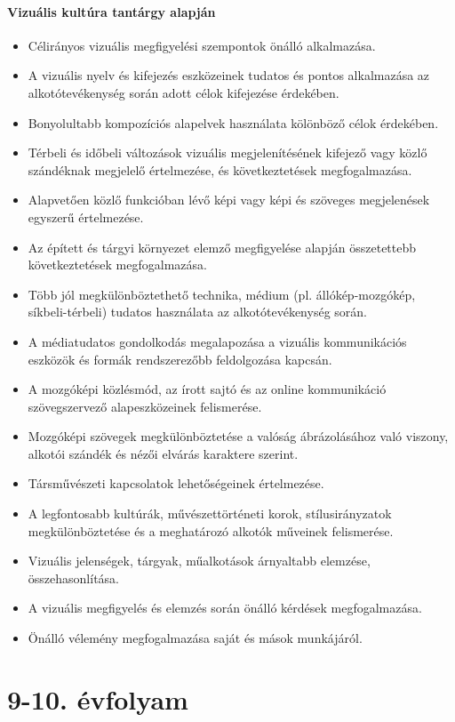 \paragraph{Vizuális kultúra tantárgy alapján}
\begin{itemize}
\item Célirányos vizuális megfigyelési szempontok önálló alkalmazása.
\item A vizuális nyelv és kifejezés eszközeinek tudatos és pontos alkalmazása az alkotótevékenység során adott célok kifejezése érdekében.
\item Bonyolultabb kompozíciós alapelvek használata kölönböző célok érdekében.
\item Térbeli és időbeli változások vizuális megjelenítésének kifejező vagy közlő szándéknak megjelelő értelmezése, és következtetések megfogalmazása.
\item Alapvetően közlő funkcióban lévő képi vagy képi és szöveges megjelenések egyszerű értelmezése.
\item Az épített és tárgyi környezet elemző megfigyelése alapján összetettebb következtetések megfogalmazása.
\item Több jól megkülönböztethető technika, médium (pl. állókép-mozgókép, síkbeli-térbeli) tudatos használata az alkotótevékenység során.
\item A médiatudatos gondolkodás megalapozása a vizuális kommunikációs eszközök és formák rendszerezőbb feldolgozása kapcsán.
\item A mozgóképi közlésmód, az írott sajtó és az online   kommunikáció szövegszervező alapeszközeinek felismerése.
\item Mozgóképi szövegek megkülönböztetése a valóság ábrázolásához való viszony, alkotói szándék és nézői elvárás karaktere szerint.
\item Társművészeti kapcsolatok lehetőségeinek értelmezése.
\item A legfontosabb kultúrák, művészettörténeti korok, stílusirányzatok megkülönböztetése és a meghatározó alkotók műveinek felismerése.
\item Vizuális jelenségek, tárgyak, műalkotások árnyaltabb elemzése, összehasonlítása.
\item A vizuális megfigyelés és elemzés során önálló kérdések megfogalmazása.
\item Önálló vélemény megfogalmazása saját és mások munkájáról.
\end{itemize}
\section{9-10. évfolyam}
